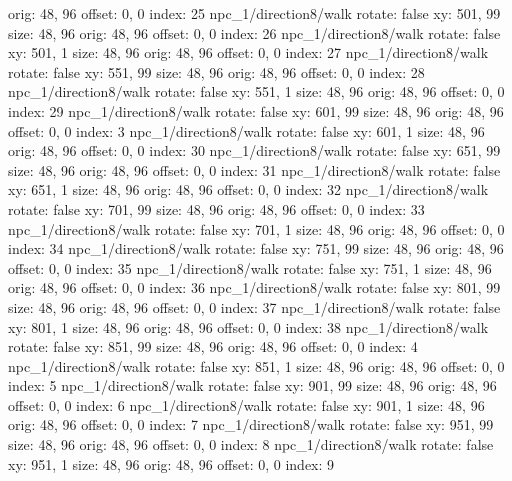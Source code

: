   orig: 48, 96
  offset: 0, 0
  index: 25
npc_1/direction8/walk
  rotate: false
  xy: 501, 99
  size: 48, 96
  orig: 48, 96
  offset: 0, 0
  index: 26
npc_1/direction8/walk
  rotate: false
  xy: 501, 1
  size: 48, 96
  orig: 48, 96
  offset: 0, 0
  index: 27
npc_1/direction8/walk
  rotate: false
  xy: 551, 99
  size: 48, 96
  orig: 48, 96
  offset: 0, 0
  index: 28
npc_1/direction8/walk
  rotate: false
  xy: 551, 1
  size: 48, 96
  orig: 48, 96
  offset: 0, 0
  index: 29
npc_1/direction8/walk
  rotate: false
  xy: 601, 99
  size: 48, 96
  orig: 48, 96
  offset: 0, 0
  index: 3
npc_1/direction8/walk
  rotate: false
  xy: 601, 1
  size: 48, 96
  orig: 48, 96
  offset: 0, 0
  index: 30
npc_1/direction8/walk
  rotate: false
  xy: 651, 99
  size: 48, 96
  orig: 48, 96
  offset: 0, 0
  index: 31
npc_1/direction8/walk
  rotate: false
  xy: 651, 1
  size: 48, 96
  orig: 48, 96
  offset: 0, 0
  index: 32
npc_1/direction8/walk
  rotate: false
  xy: 701, 99
  size: 48, 96
  orig: 48, 96
  offset: 0, 0
  index: 33
npc_1/direction8/walk
  rotate: false
  xy: 701, 1
  size: 48, 96
  orig: 48, 96
  offset: 0, 0
  index: 34
npc_1/direction8/walk
  rotate: false
  xy: 751, 99
  size: 48, 96
  orig: 48, 96
  offset: 0, 0
  index: 35
npc_1/direction8/walk
  rotate: false
  xy: 751, 1
  size: 48, 96
  orig: 48, 96
  offset: 0, 0
  index: 36
npc_1/direction8/walk
  rotate: false
  xy: 801, 99
  size: 48, 96
  orig: 48, 96
  offset: 0, 0
  index: 37
npc_1/direction8/walk
  rotate: false
  xy: 801, 1
  size: 48, 96
  orig: 48, 96
  offset: 0, 0
  index: 38
npc_1/direction8/walk
  rotate: false
  xy: 851, 99
  size: 48, 96
  orig: 48, 96
  offset: 0, 0
  index: 4
npc_1/direction8/walk
  rotate: false
  xy: 851, 1
  size: 48, 96
  orig: 48, 96
  offset: 0, 0
  index: 5
npc_1/direction8/walk
  rotate: false
  xy: 901, 99
  size: 48, 96
  orig: 48, 96
  offset: 0, 0
  index: 6
npc_1/direction8/walk
  rotate: false
  xy: 901, 1
  size: 48, 96
  orig: 48, 96
  offset: 0, 0
  index: 7
npc_1/direction8/walk
  rotate: false
  xy: 951, 99
  size: 48, 96
  orig: 48, 96
  offset: 0, 0
  index: 8
npc_1/direction8/walk
  rotate: false
  xy: 951, 1
  size: 48, 96
  orig: 48, 96
  offset: 0, 0
  index: 9


